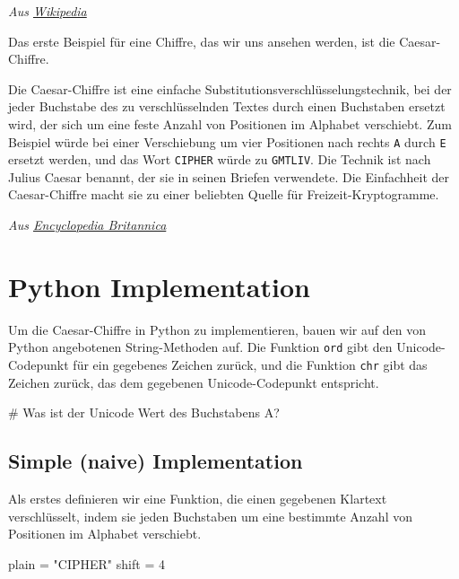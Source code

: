 \documentclass[
  nswissgerman,
  a4paper,
  DIV=11,
  numbers=noendperiod,
  ngerman]{scrreprt}
\newenvironment{Shaded}{\begin{snugshade}}{\end{snugshade}}
\newcommand{\CommentTok}[1]{\textcolor[rgb]{0.37,0.37,0.37}{#1}}
\newcommand{\DecValTok}[1]{\textcolor[rgb]{0.68,0.00,0.00}{#1}}
\newcommand{\NormalTok}[1]{\textcolor[rgb]{0.00,0.23,0.31}{#1}}
\newcommand{\OperatorTok}[1]{\textcolor[rgb]{0.37,0.37,0.37}{#1}}
\newcommand{\StringTok}[1]{\textcolor[rgb]{0.13,0.47,0.30}{#1}}
\begin{document}
\emph{Aus \href{https://en.wikipedia.org/wiki/Encryption}{Wikipedia}}

Das erste Beispiel für eine Chiffre, das wir uns ansehen werden, ist die
Caesar-Chiffre.

Die Caesar-Chiffre ist eine einfache
Substitutionsverschlüsselungstechnik, bei der jeder Buchstabe des zu
verschlüsselnden Textes durch einen Buchstaben ersetzt wird, der sich um
eine feste Anzahl von Positionen im Alphabet verschiebt. Zum Beispiel
würde bei einer Verschiebung um vier Positionen nach rechts \texttt{A}
durch \texttt{E} ersetzt werden, und das Wort \texttt{CIPHER} würde zu
\texttt{GMTLIV}. Die Technik ist nach Julius Caesar benannt, der sie in
seinen Briefen verwendete. Die Einfachheit der Caesar-Chiffre macht sie
zu einer beliebten Quelle für Freizeit-Kryptogramme.

\emph{Aus
\href{https://www.britannica.com/topic/Caesar-cipher}{Encyclopedia
Britannica}}

\section{Python Implementation}\label{python-implementation}

Um die Caesar-Chiffre in Python zu implementieren, bauen wir auf den von
Python angebotenen String-Methoden auf. Die Funktion \texttt{ord} gibt
den Unicode-Codepunkt für ein gegebenes Zeichen zurück, und die Funktion
\texttt{chr} gibt das Zeichen zurück, das dem gegebenen
Unicode-Codepunkt entspricht.

\begin{Shaded}
\begin{Highlighting}[numbers=left,,]
\CommentTok{\# Was ist der Unicode Wert des Buchstabens \textquotesingle{}A\textquotesingle{}?}
\end{Highlighting}
\end{Shaded}

\subsection{Simple (naive)
Implementation}\label{simple-naive-implementation}

Als erstes definieren wir eine Funktion, die einen gegebenen Klartext
verschlüsselt, indem sie jeden Buchstaben um eine bestimmte Anzahl von
Positionen im Alphabet verschiebt.

\begin{Shaded}
\begin{Highlighting}[numbers=left,,]
\NormalTok{plain }\OperatorTok{=} \StringTok{"CIPHER"}
\NormalTok{shift }\OperatorTok{=} \DecValTok{4}
\end{Highlighting}
\end{Shaded}
\end{document}
